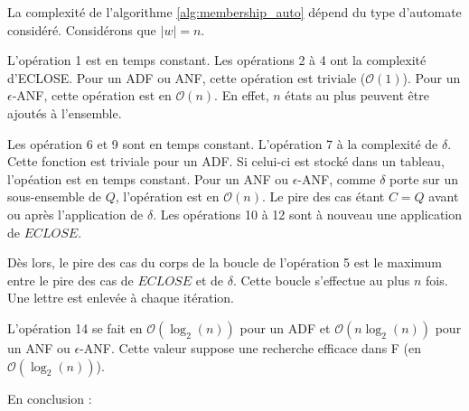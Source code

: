 \begin{complexity}

La complexité de l'algorithme \ref{alg:membership_auto} dépend du type d'automate considéré. Considérons que $|w|=n$.

L'opération 1 est en temps constant. Les opérations 2 à 4 ont la complexité d'ECLOSE. Pour un ADF ou ANF, cette opération est triviale ($\mathcal{O}(1)$). Pour un $\epsilon$-ANF, cette opération est en $\mathcal{O}(n)$. En effet, $n$ états au plus peuvent être ajoutés à l'ensemble.

Les opération 6 et 9 sont en temps constant. L'opération 7 à la complexité de $\delta$. Cette fonction est triviale pour un ADF. Si celui-ci est stocké dans un tableau, l'opéation est en temps constant. Pour un ANF ou $\epsilon$-ANF, comme $\delta$ porte sur un sous-ensemble de $Q$, l'opération est en $\mathcal{O}(n)$. Le pire des cas étant $C=Q$ avant ou après l'application de $\delta$. Les opérations 10 à 12 sont à nouveau une application de $ECLOSE$.

Dès lors, le pire des cas du corps de la boucle de l'opération 5 est le maximum entre le pire des cas de $ECLOSE$ et de $\delta$. Cette boucle s'effectue au plus $n$ fois. Une lettre est enlevée à chaque itération.

L'opération 14 se fait en $\mathcal{O}(\log_2(n))$ pour un ADF et $\mathcal{O}(n\log_2(n))$ pour un ANF ou $\epsilon$-ANF. Cette valeur suppose une recherche efficace dans F (en $\mathcal{O}(\log_2(n))$).

En conclusion :
\begin{table}[H]
  \centering
\end{table}



\end{complexity}




